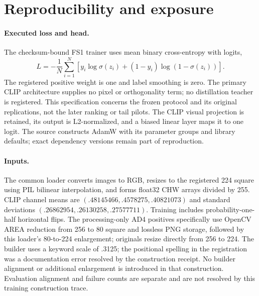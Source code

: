 \section{Reproducibility and exposure}
\label{sec:supp-reproducibility}
\paragraph{Executed loss and head.}
The checksum-bound FS1 trainer uses mean binary cross-entropy with logits,
\begin{equation}
 L=-\frac1N\sum_{i=1}^N[y_i\log\sigma(z_i)+(1-y_i)\log(1-\sigma(z_i))].
\end{equation}
The registered positive weight is one and label smoothing is zero. The primary CLIP architecture supplies no pixel or orthogonality term; no distillation teacher is registered. This specification concerns the frozen protocol and its original replications, not the later ranking or tail pilots. The CLIP visual projection is retained, its output is L2-normalized, and a biased linear layer maps it to one logit. The source constructs AdamW with its parameter groups and library defaults; exact dependency versions remain part of reproduction.

\paragraph{Inputs.}
The common loader converts images to RGB, resizes to the registered 224 square using PIL bilinear interpolation, and forms float32 CHW arrays divided by 255. CLIP channel means are $(.48145466,.4578275,.40821073)$ and standard deviations $(.26862954,.26130258,.27577711)$. Training includes probability-one-half horizontal flips. The processing-only AD4 positives specifically use OpenCV AREA reduction from 256 to 80 square and lossless PNG storage, followed by this loader's 80-to-224 enlargement; originals resize directly from 256 to 224. The builder uses a keyword scale of .3125; the positional spelling in the registration was a documentation error resolved by the construction receipt. No builder alignment or additional enlargement is introduced in that construction. Evaluation alignment and failure counts are separate and are not resolved by this training construction trace.

